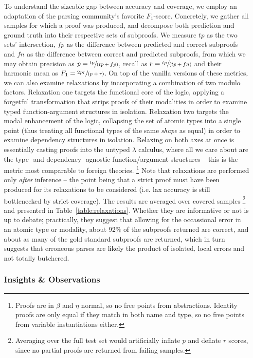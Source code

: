 To understand the sizeable gap between accuracy and coverage, we employ an adaptation of the parsing community's favorite $F_1$-score.
Concretely, we gather all samples for which a proof was produced, and decompose both prediction and ground truth into their respective sets of subproofs.
We measure $tp$ as the two sets' intersection, $fp$ as the difference between predicted and correct subproofs and $fn$ as the difference between correct and predicted subproofs, from which we may obtain precision as $p = \sfrac{tp}{(tp+fp)}$, recall as $r = \sfrac{tp}{(tp+fn)}$ and their harmonic mean as $F_1 = \sfrac{2 p r}{(p + r)}$.
On top of the vanilla versions of these metrics, we can also examine relaxations by incorporating a combination of two modulo factors.
Relaxation one targets the functional core of the logic, applying a forgetful transformation that strips proofs of their modalities in order to examine typed function-argument structures in isolation.
Relaxation two targets the modal enhancement of the logic, collapsing the set of atomic types into a single point (thus treating all functional types of the same \textit{shape} as equal) in order to examine dependency structures in isolation.
Relaxing on both axes at once is essentially casting proofs into the untyped $\lambda$ calculus, where all we care about are the type- and dependency- agnostic function/argument structures -- this is the metric most comparable to foreign theories.%
	\footnote{Proofs are in $\beta$ and $\eta$ normal, so no free points from abstractions. Identity proofs are only equal if they match in both name and type, so no free points from variable instantiations either.}
Note that relaxations are performed only \textit{after} inference -- the point being that a strict proof must have been produced for its relaxations to be considered (i.e. lax accuracy is still bottlenecked by strict coverage).
The results are averaged over covered samples%
	\footnote{Averaging over the full test set would artificially inflate $p$ and deflate $r$ scores, since no partial proofs are returned from failing samples.}
and presented in Table~\ref{table:relaxations}.
Whether they are informative or not is up to debate; practically, they suggest that allowing for the occassional error in an atomic type or modality, about 92\% of the subproofs returned are correct, and about as many of the gold standard subproofs are returned, which in turn suggests that erroneous parses are likely the product of isolated, local errors and not totally butchered.

\subsubsection{Insights \& Observations}
